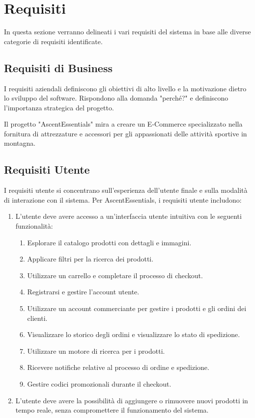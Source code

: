 
\chapter{Requisiti}

In questa sezione verranno delineati i vari requisiti del sistema in base alle diverse categorie di requisiti identificate.

\section{Requisiti di Business}
I requisiti aziendali definiscono gli obiettivi di alto livello e la motivazione dietro lo sviluppo del software. Rispondono alla domanda "perché?" e definiscono l'importanza strategica del progetto.

Il progetto "AscentEssentials" mira a creare un E-Commerce specializzato nella fornitura di attrezzature e accessori per gli appassionati delle attività sportive in montagna.

\section{Requisiti Utente}
I requisiti utente si concentrano sull'esperienza dell'utente finale e sulla modalità di interazione con il sistema. Per AscentEssentials, i requisiti utente includono:

\begin{enumerate}
    \item L'utente deve avere accesso a un'interfaccia utente intuitiva con le seguenti funzionalità:
          \begin{enumerate}
              \item Esplorare il catalogo prodotti con dettagli e immagini.
              \item Applicare filtri per la ricerca dei prodotti.
              \item Utilizzare un carrello e completare il processo di checkout.
              \item Registrarsi e gestire l'account utente.
              \item Utilizzare un account commerciante per gestire i prodotti e gli ordini dei clienti.
              \item Visualizzare lo storico degli ordini e visualizzare lo stato di spedizione.
              \item Utilizzare un motore di ricerca per i prodotti.
              \item Ricevere notifiche relative al processo di ordine e spedizione.
              \item Gestire codici promozionali durante il checkout.
          \end{enumerate}
    \item L'utente deve avere la possibilità di aggiungere o rimuovere nuovi prodotti in tempo reale, senza compromettere il funzionamento del sistema.
\end{enumerate}
